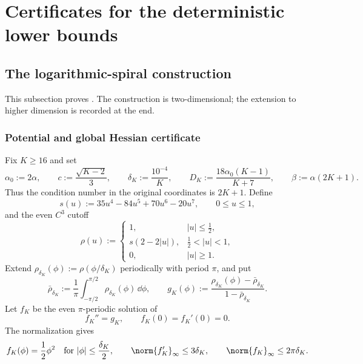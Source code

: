 \section{Certificates for the deterministic lower bounds}
\label{app:deterministic-lower-bounds}

\subsection{The logarithmic-spiral construction}
\label{app:spiral}

This subsection proves .  The construction is
two-dimensional; the extension to higher dimension is recorded at the end.

\subsubsection{Potential and global Hessian certificate}

Fix \(K\geq16\) and set
\begin{equation}
\label{app:spiral:parameters}
    \alpha_0:=2\alpha,
    \qquad
    c:=\frac{\sqrt{K-2}}3,
    \qquad
    \delta_K:=\frac{10^{-4}}K,
    \qquad
    D_K:=\frac{18\alpha_0(K-1)}{K+7},
    \qquad
    \beta:=\alpha(2K+1).
\end{equation}
Thus the condition number in the original coordinates is \(2K+1\).
Define
\[
    s(u):=35u^4-84u^5+70u^6-20u^7,
    \qquad 0\leq u\leq1,
\]
and the even \(C^3\) cutoff
\begin{equation}
\label{app:spiral:phase-bump}
    \rho(u):=
    \begin{cases}
        1, & |u|\leq\tfrac12,\\[1mm]
        s(2-2|u|), & \tfrac12<|u|<1,\\[1mm]
        0, & |u|\geq1.
    \end{cases}
\end{equation}
Extend \(\rho_{\delta_K}(\phi):=\rho(\phi/\delta_K)\) periodically with
period \(\pi\), and put
\[
    \bar\rho_{\delta_K}
    :=\frac1\pi\int_{-\pi/2}^{\pi/2}\rho_{\delta_K}(\phi)\,\dd\phi,
    \qquad
    g_K(\phi)
    :=\frac{\rho_{\delta_K}(\phi)-\bar\rho_{\delta_K}}
            {1-\bar\rho_{\delta_K}}.
\]
Let \(f_K\) be the even \(\pi\)-periodic solution of
\begin{equation}
\label{app:spiral:fK-equation}
    f_K''=g_K,
    \qquad
    f_K(0)=f_K'(0)=0.
\end{equation}
The normalization gives
\begin{equation}
\label{app:spiral:fK-bounds}
    f_K(\phi)=\frac12\phi^2
    \quad\text{for }|\phi|\leq\frac{\delta_K}{2},
    \qquad
    \norm{f_K'}_\infty\leq3\delta_K,
    \qquad
    \norm{f_K}_\infty\leq2\pi\delta_K.
\end{equation}

